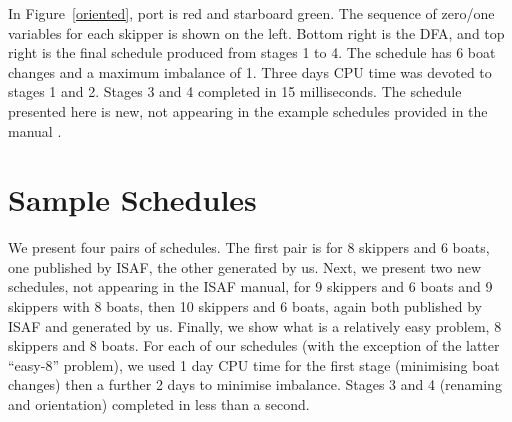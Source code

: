 \documentclass{llncs}
\begin{document}
In Figure~\ref{oriented}, port is red and starboard green. The sequence of zero/one variables for
each skipper is shown on the left. Bottom right is the DFA, and top right is the final schedule
produced from stages 1 to 4. The schedule has 6 boat changes and a maximum imbalance of 1. Three
days CPU time was devoted to stages 1 and 2. Stages 3 and 4 completed in 15 milliseconds. The
schedule presented here is new, not appearing in the example schedules provided in the manual
\cite{isaf}.

\section{Sample Schedules}\label{sec:samples}

We present four pairs of schedules. The first pair is for 8 skippers and 6 boats, one published by
ISAF, the other generated by us. Next, we present two new schedules, not appearing in the ISAF
manual, for 9 skippers and 6 boats and 9 skippers with 8 boats, then 10 skippers and 6 boats, again
both published by ISAF and generated by us. Finally, we show what is a relatively easy problem, 8 skippers
and 8 boats.  For each of our schedules (with the exception of the latter ``easy-8'' problem), we used 1 day
CPU time for the first stage (minimising boat changes) then a further 2 days to minimise imbalance.
Stages 3 and 4 (renaming and orientation) completed in less than a second.
\end{document}
